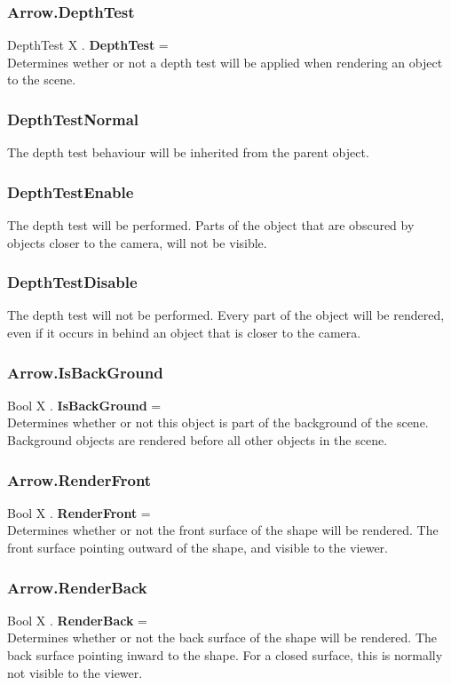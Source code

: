 \documentclass[10pt]{book}
\begin{document}
\subsubsection{Arrow.DepthTest \label{F:Arrow:DepthTest}}
DepthTest X . \textbf{DepthTest} = \\
Determines wether or not a depth test will be applied when rendering an object to the scene.

\subsubsection{DepthTestNormal \label{T:DepthTest|DepthTestNormal}}
The depth test behaviour will be inherited from the parent object.

\subsubsection{DepthTestEnable \label{T:DepthTest|DepthTestEnable}}
The depth test will be performed. Parts of the object that are obscured by objects closer to the camera, will not be visible.

\subsubsection{DepthTestDisable \label{T:DepthTest|DepthTestDisable}}
The depth test will not be performed. Every part of the object will be rendered, even if it occurs in behind an object that is closer to the camera.

\subsubsection{Arrow.IsBackGround \label{F:Arrow:IsBackGround}}
Bool X . \textbf{IsBackGround} = \\
Determines whether or not this object is part of the background of the scene. Background objects are rendered before all other objects in the scene.

\subsubsection{Arrow.RenderFront \label{F:Arrow:RenderFront}}
Bool X . \textbf{RenderFront} = \\
Determines whether or not the front surface of the shape will be rendered. The front surface pointing outward of the shape, and visible to the viewer.

\subsubsection{Arrow.RenderBack \label{F:Arrow:RenderBack}}
Bool X . \textbf{RenderBack} = \\
Determines whether or not the back surface of the shape will be rendered. The back surface pointing inward to the shape. For a closed surface, this is normally not visible to the viewer.
\end{document}
